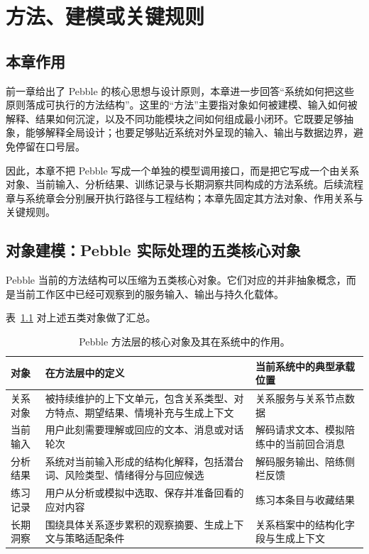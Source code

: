 \chapter{方法、建模或关键规则}

\section{本章作用}

前一章给出了 Pebble 的核心思想与设计原则，本章进一步回答“系统如何把这些原则落成可执行的方法结构”。这里的“方法”主要指对象如何被建模、输入如何被解释、结果如何沉淀，以及不同功能模块之间如何组成最小闭环。它既要足够抽象，能够解释全局设计；也要足够贴近系统对外呈现的输入、输出与数据边界，避免停留在口号层。

因此，本章不把 Pebble 写成一个单独的模型调用接口，而是把它写成一个由关系对象、当前输入、分析结果、训练记录与长期洞察共同构成的方法系统。后续流程章与系统章会分别展开执行路径与工程结构；本章先固定其方法对象、作用关系与关键规则。

\section{对象建模：Pebble 实际处理的五类核心对象}

Pebble 当前的方法结构可以压缩为五类核心对象。它们对应的并非抽象概念，而是当前工作区中已经可观察到的服务输入、输出与持久化载体。

表~\ref{tab:pebble-method-objects} 对上述五类对象做了汇总。

\begin{table}[H]
  \centering
  \caption{Pebble 方法层的核心对象及其在系统中的作用。}
  \label{tab:pebble-method-objects}
  \begin{tabularx}{\textwidth}{>{\raggedright\arraybackslash}p{2.5cm} >{\raggedright\arraybackslash}X >{\raggedright\arraybackslash}X}
    \toprule
    对象 & 在方法层中的定义 & 当前系统中的典型承载位置 \\
    \midrule
    关系对象 & 被持续维护的上下文单元，包含关系类型、对方特点、期望结果、情境补充与生成上下文 & 关系服务与关系节点数据 \\
    当前输入 & 用户此刻需要理解或回应的文本、消息或对话轮次 & 解码请求文本、模拟陪练中的当前回合消息 \\
    分析结果 & 系统对当前输入形成的结构化解释，包括潜台词、风险类型、情绪得分与回应候选 & 解码服务输出、陪练侧栏反馈 \\
    练习记录 & 用户从分析或模拟中选取、保存并准备回看的应对内容 & 练习本条目与收藏结果 \\
    长期洞察 & 围绕具体关系逐步累积的观察摘要、生成上下文与策略适配条件 & 关系档案中的结构化字段与生成上下文 \\
    \bottomrule
  \end{tabularx}
\end{table}


